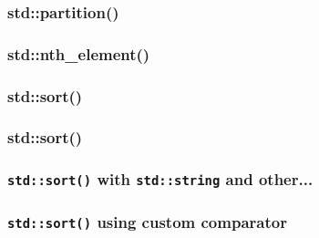 \documentclass{beamer}
\begin{document}
\frame
{
	\frametitle{\ttfamily std::partition()}
	
	\small
	
}

\frame
{
	\frametitle{\ttfamily std::nth\_element()}
	
	
}

\subsubsection{std::sort()}

\frame
{
	\frametitle{\ttfamily std::sort()}
	
	
}

\frame
{
	\frametitle{\texttt{std::sort()} with \texttt{std::string} and other...}
	
	
}

\frame
{
	\frametitle{\texttt{std::sort()} using custom comparator}
	
	
}
\end{document}
